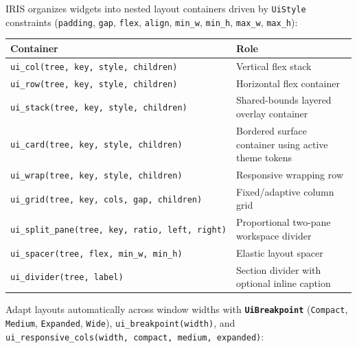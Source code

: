 \documentclass[
  english,
  oneside]{book}
\newcounter{none} %
\begin{document}
IRIS organizes widgets into nested layout containers driven by
\texttt{UiStyle} constraints (\texttt{padding}, \texttt{gap},
\texttt{flex}, \texttt{align}, \texttt{min\_w}, \texttt{min\_h},
\texttt{max\_w}, \texttt{max\_h}):

{\def\LTcaptype{none} %
\begin{longtable}[]{@{}
  >{\raggedright\arraybackslash}p{}
  >{\raggedright\arraybackslash}p{}@{}}
\toprule\noalign{}
\begin{minipage}[b]{\linewidth}\raggedright
Container
\end{minipage} & \begin{minipage}[b]{\linewidth}\raggedright
Role
\end{minipage} \\
\midrule\noalign{}
\endhead
\bottomrule\noalign{}
\endlastfoot
\texttt{ui\_col(tree,\ key,\ style,\ children)} & Vertical flex stack \\
\texttt{ui\_row(tree,\ key,\ style,\ children)} & Horizontal flex
container \\
\texttt{ui\_stack(tree,\ key,\ style,\ children)} & Shared-bounds
layered overlay container \\
\texttt{ui\_card(tree,\ key,\ style,\ children)} & Bordered surface
container using active theme tokens \\
\texttt{ui\_wrap(tree,\ key,\ style,\ children)} & Responsive wrapping
row \\
\texttt{ui\_grid(tree,\ key,\ cols,\ gap,\ children)} & Fixed/adaptive
column grid \\
\texttt{ui\_split\_pane(tree,\ key,\ ratio,\ left,\ right)} &
Proportional two-pane workspace divider \\
\texttt{ui\_spacer(tree,\ flex,\ min\_w,\ min\_h)} & Elastic layout
spacer \\
\texttt{ui\_divider(tree,\ label)} & Section divider with optional
inline caption \\
\end{longtable}
}

Adapt layouts automatically across window widths with
\textbf{\texttt{UiBreakpoint}} (\texttt{Compact}, \texttt{Medium},
\texttt{Expanded}, \texttt{Wide}), \texttt{ui\_breakpoint(width)}, and
\texttt{ui\_responsive\_cols(width,\ compact,\ medium,\ expanded)}:
\end{document}
